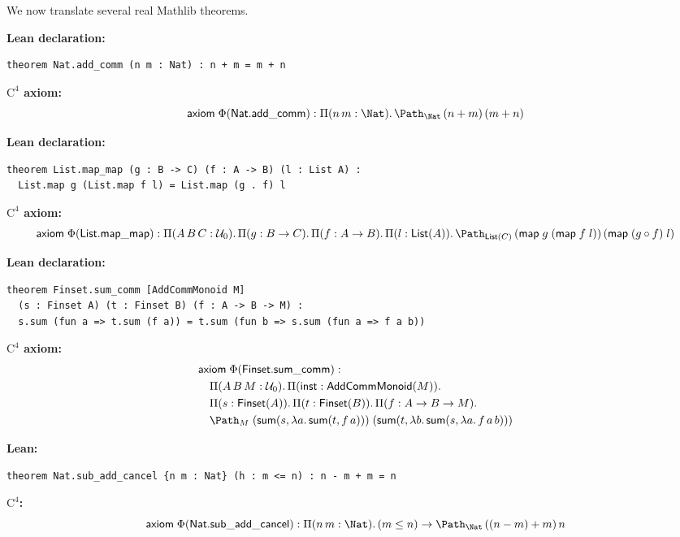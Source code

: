 We now translate several real Mathlib theorems.

\begin{example}
\textbf{Lean declaration:}
\begin{lstlisting}[language={}]
theorem Nat.add_comm (n m : Nat) : n + m = m + n
\end{lstlisting}
\textbf{$\mathrm{C}^4$ axiom:}
\[
  \mathsf{axiom}\;\Phi(\mathsf{Nat.add\_comm}) :
  \Pi(n\, m : \Nat).\, \Path_\Nat\, (n + m)\, (m + n)
\]
\end{example}

\begin{example}
\textbf{Lean declaration:}
\begin{lstlisting}[language={}]
theorem List.map_map (g : B -> C) (f : A -> B) (l : List A) :
  List.map g (List.map f l) = List.map (g . f) l
\end{lstlisting}
\textbf{$\mathrm{C}^4$ axiom:}
\[
  \mathsf{axiom}\;\Phi(\mathsf{List.map\_map}) :
  \Pi(A\, B\, C : \mathcal{U}_0).\,
  \Pi(g : B \to C).\, \Pi(f : A \to B).\,
  \Pi(l : \mathsf{List}(A)).\,
  \Path_{\mathsf{List}(C)}\,
    (\mathsf{map}\;g\;(\mathsf{map}\;f\;l))\,
    (\mathsf{map}\;(g \circ f)\;l)
\]
\end{example}

\begin{example}
\textbf{Lean declaration:}
\begin{lstlisting}[language={}]
theorem Finset.sum_comm [AddCommMonoid M]
  (s : Finset A) (t : Finset B) (f : A -> B -> M) :
  s.sum (fun a => t.sum (f a)) = t.sum (fun b => s.sum (fun a => f a b))
\end{lstlisting}
\textbf{$\mathrm{C}^4$ axiom:}
\begin{align*}
  &\mathsf{axiom}\;\Phi(\mathsf{Finset.sum\_comm}) : \\
  &\quad \Pi(A\, B\, M : \mathcal{U}_0).\,
  \Pi(\mathsf{inst} : \mathsf{AddCommMonoid}(M)).\, \\
  &\quad \Pi(s : \mathsf{Finset}(A)).\,
  \Pi(t : \mathsf{Finset}(B)).\,
  \Pi(f : A \to B \to M).\, \\
  &\quad \Path_M\;
    (\mathsf{sum}(s, \lambda a.\, \mathsf{sum}(t, f\,a)))\;
    (\mathsf{sum}(t, \lambda b.\, \mathsf{sum}(s, \lambda a.\, f\,a\,b)))
\end{align*}
\end{example}

\begin{example}
\textbf{Lean:}
\begin{lstlisting}[language={}]
theorem Nat.sub_add_cancel {n m : Nat} (h : m <= n) : n - m + m = n
\end{lstlisting}
\textbf{$\mathrm{C}^4$:}
\[
  \mathsf{axiom}\;\Phi(\mathsf{Nat.sub\_add\_cancel}) :
  \Pi(n\, m : \Nat).\, (m \leq n) \to
  \Path_\Nat\, ((n - m) + m)\, n
\]
\end{example}

